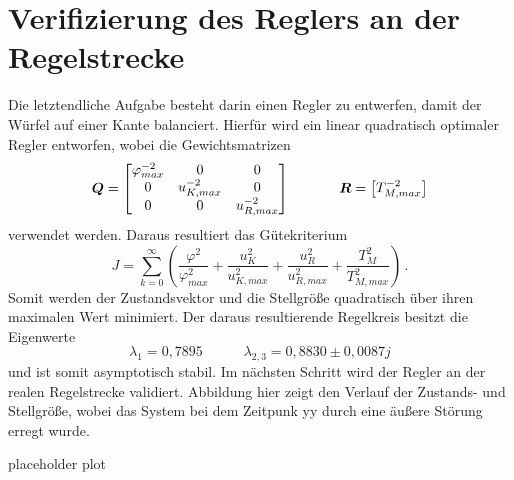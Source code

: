 \section{Verifizierung des Reglers an der Regelstrecke}
Die letztendliche Aufgabe besteht darin einen Regler zu entwerfen, damit der Würfel auf einer Kante balanciert. Hierfür wird ein linear quadratisch optimaler Regler entworfen, wobei die Gewichtsmatrizen
\begin{equation}
\boldsymbol{Q} = \begin{bmatrix}
\varphi^{-2}_{max} & 0 & 0 \\
0 & u^{-2}_{K,max} & 0 \\
0 & 0 & u^{-2}_{R,max}
\end{bmatrix}
\hspace{35pt}
\boldsymbol{R} = \begin{bmatrix} T^{-2}_{M,max} \end{bmatrix}
\end{equation}
verwendet werden. Daraus resultiert das Gütekriterium
\begin{equation}
J = \sum^{\infty}_{k=0}\left( \frac{\varphi^2}{\varphi^2_{max}} + \frac{u_K^2}{u^2_{K,max}} + \frac{u^2_{R}}{u^2_{R,max}} + \frac{T_M^2}{T^2_{M,max}}\right)\,.
\end{equation}
Somit werden der Zustandsvektor und die Stellgröße quadratisch über ihren maximalen Wert minimiert. Der daraus resultierende Regelkreis besitzt die Eigenwerte
\begin{equation}
\lambda_1 = 0,7895 \hspace{35pt} \lambda_{2,3} = 0,8830 \pm 0,0087j
\end{equation}
und ist somit asymptotisch stabil. Im nächsten Schritt wird der Regler an der realen Regelstrecke validiert. Abbildung hier zeigt den Verlauf der Zustands- und Stellgröße, wobei das System bei dem Zeitpunk yy durch eine äußere Störung erregt wurde.

placeholder plot

